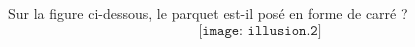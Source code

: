 Sur la figure ci-dessous, le parquet est-il posé en forme de carré ?
\[\texttt{[image: illusion.2]}\]
